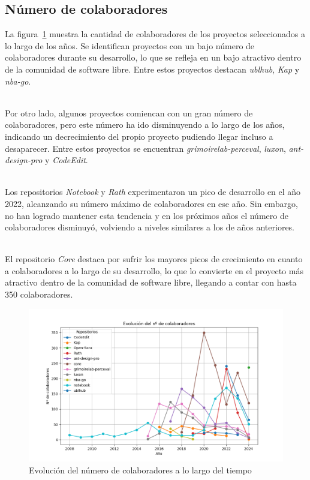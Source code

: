 \documentclass[a4paper, 12pt]{book}
\begin{document}
\subsection{Número de colaboradores}
\label{subsec:número-colaboradores}

La figura~\ref{fig:grafica-colaboradores} muestra la cantidad de colaboradores de los proyectos seleccionados a lo largo de los años. Se identifican proyectos con un bajo número de colaboradores
durante su desarrollo, lo que se refleja en un bajo atractivo dentro de la comunidad de software libre. Entre estos proyectos destacan \textit{ublhub}, \textit{Kap} y \textit{nba-go}.

\\Por otro lado, algunos proyectos comiencan con un gran número de colaboradores, pero este número ha ido disminuyendo a lo largo de los años, indicando un decrecimiento del propio proyecto
pudiendo llegar incluso a desaparecer. Entre estos proyectos se encuentran \textit{grimoirelab-perceval}, \textit{luxon}, \textit{ant-design-pro} y \textit{CodeEdit}.

\\Los repositorios \textit{Notebook} y \textit{Rath} experimentaron un pico de desarrollo en el año 2022, alcanzando su número máximo de colaboradores en ese año. Sin embargo, no han logrado mantener
esta tendencia y en los próximos años el número de colaboradores disminuyó, volviendo a niveles similares a los de años anteriores.

\\El repositorio \textit{Core} destaca por sufrir los mayores picos de crecimiento en cuanto a colaboradores a lo largo de su desarrollo, lo que lo convierte en el proyecto más atractivo dentro de la
comunidad de software libre, llegando a contar con hasta 350 colaboradores.

\begin{figure}
  \centering
  \includegraphics[width=16cm, keepaspectratio]{img/contributors_graph.png}
  \caption{Evolución del número de colaboradores a lo largo del tiempo}
  \label{fig:grafica-colaboradores}
\end{figure}
\end{document}
